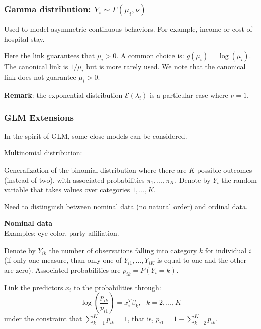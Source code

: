 \documentclass{beamer}
\newcommand{\bs}{\bigskip}
\begin{document}
\begin{frame}
\frametitle{Gamma distribution: $Y_i \sim \Gamma(\mu_i,\nu)$}

Used to model asymmetric continuous behaviors. For example, income or cost of
hospital stay.

\bs 
Here the link guarantees that $\mu_i>0$. A common choice is:
$g(\mu_i) = \log(\mu_i)$. The canonical link is $1/\mu_i$ but is more rarely
used. We note that the canonical link does not guarantee $\mu_i>0$.

\bs

\textbf{Remark}: the exponential distribution ${\mathcal E}(\lambda_i)$ is a
particular case where $\nu=1$.

\end{frame}


\begin{frame}
\frametitle{GLM Extensions}

In the spirit of GLM, some close models can be considered.

\bs

{\color{blue}Multinomial distribution:}

\bs
Generalization of the binomial distribution where there are $K$ possible
outcomes (instead of two), with associated probabilities $\pi_1, \ldots,
\pi_K$. Denote by $Y_i$ the random variable that takes values over categories
$1,\ldots,K$.


\bs
Need to distinguish between {\color{blue}nominal} data (no natural order) and 
{\color{blue}ordinal} data.
\end{frame}


\begin{frame}
\textbf{Nominal data}\\
Examples: eye color, party affiliation.

\bs
Denote by $Y_{ik}$ the number of observations falling into category $k$ for
individual $i$ (if only one measure, than only one of $Y_{i1},\ldots,Y_{iK}$ is
equal to one and the other are zero). Associated probabilities are $p_{ik} =
P(Y_i=k)$. 

\bs
Link the predictors $x_i$ to the probabilities through:
$$\log\left(\frac{p_{ik}}{p_{i1}} \right) = x_i^T \beta_k, \ \ \ k=2,\ldots,K$$
under the constraint that $\sum_{k=1}^K p_{ik}=1$, that is, $p_{i1}=1-
\sum_{k=2}^K p_{ik}$. 


\end{frame}
\end{document}
